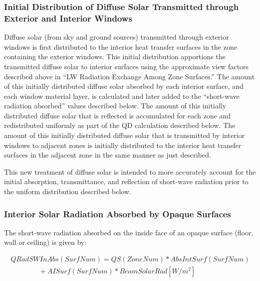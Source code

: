 \subsubsection{Initial Distribution of Diffuse Solar Transmitted through Exterior and Interior Windows}\label{initial-distribution-of-diffuse-solar-transmitted-through-exterior-and-interior-windows}

Diffuse solar (from sky and ground sources) transmitted through exterior windows is first distributed to the interior heat transfer surfaces in the zone containing the exterior windows. This initial distribution apportions the transmitted diffuse solar to interior surfaces using the approximate view factors described above in ``LW Radiation Exchange Among Zone Surfaces.'' The amount of this initially distributed diffuse solar absorbed by each interior surface, and each window material layer, is calculated and later added to the ``short-wave radiation absorbed'' values described below. The amount of this initially distributed diffuse solar that is reflected is accumulated for each zone and redistributed uniformly as part of the QD calculation described below. The amount of this initially distributed diffuse solar that is transmitted by interior windows to adjacent zones is initially distributed to the interior heat transfer surfaces in the adjacent zone in the same manner as just described.

This new treatment of diffuse solar is intended to more accurately account for the initial absorption, transmittance, and reflection of short-wave radiation prior to the uniform distribution described below.

\subsubsection{Interior Solar Radiation Absorbed by Opaque Surfaces}\label{interior-solar-radiation-absorbed-by-opaque-surfaces}

The short-wave radiation absorbed on the inside face of an opaque surface (floor, wall or ceiling) is given by:

\begin{equation}
\begin{array}{l}
QRadSWInAbs(SurfNum) = QS(ZoneNum)*AbsIntSurf(SurfNum) \\
\quad \quad \quad \quad+ AISurf(SurfNum)*BeamSolarRad [W/m^2]
\end{array}
\label{eq:ShortWaveRadInsideFaceOpaqueSurf}
\end{equation}

